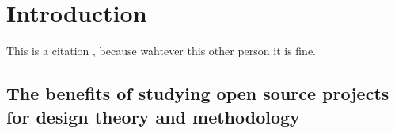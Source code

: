 \documentclass{ICED-Paper}%
\begin{document}

\section{Introduction}

This is a citation \cite{RepRap}, because wahtever this other person \cite{vonHippel_1} it is fine.

\subsection{The benefits of studying open source projects for design theory and methodology}
\end{document}

